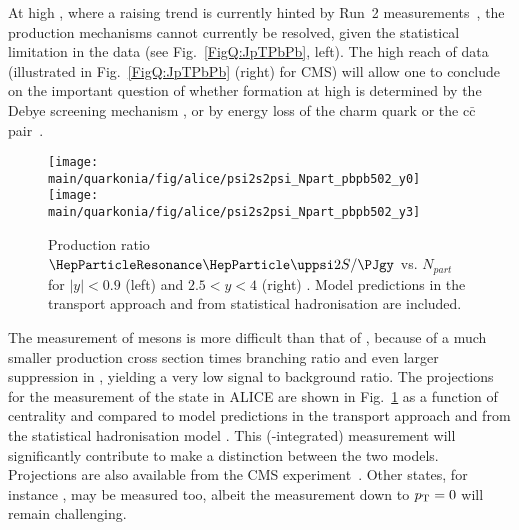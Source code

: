\documentclass[../report.tex]{subfiles}
\providecommand{\main}{..}
\begin{document}
At high \pT, where a raising trend is currently hinted by Run~2 \raa measurements~\cite{Sirunyan:2017isk,Aaboud:2018quy}, the production mechanisms cannot currently be resolved, given the statistical limitation in the data (see Fig.~\ref{FigQ:JpTPbPb}, left). The high \pt reach of \RunsThreeFour data (illustrated in Fig.~\ref{FigQ:JpTPbPb} (right) for CMS) will allow one to conclude on the important question of whether \PJgy
formation at high \pt is determined by the Debye screening mechanism \cite{Kopeliovich:2014una,Aronson:2017ymv}, or by %
energy loss of the charm quark or the $\text{c}\bar{\text{c}}$ pair~\cite{Spousta:2016agr,Arleo:2017ntr}.



\begin{figure}[h]
\begin{center}
 \texttt{[image: \\main/quarkonia/fig/alice/psi2s2psi\_Npart\_pbpb502\_y0]}
 \texttt{[image: \\main/quarkonia/fig/alice/psi2s2psi\_Npart\_pbpb502\_y3]}
\end{center}
 \caption{Production ratio $\PGyP{2S}/\PJgy$ vs. $N_{part}$ for $|y|<0.9$ (left) and $2.5<y<4$ (right) \cite{Abelevetal:2014cna,CERN-LHCC-2013-014}. Model predictions in the transport approach \cite{Du:2015wha}  and from statistical hadronisation \cite{Andronic:2017pug} are included.}
\label{FigQ:psi2SPbPb}
\end{figure}

The measurement of  mesons is more difficult than that of \PJgy, because of a much smaller production cross section times branching ratio and even larger suppression in \PbPb, yielding a very low signal to background ratio.
The projections for the measurement of the  state in ALICE are shown in Fig.~\ref{FigQ:psi2SPbPb} as a function of centrality and compared to model predictions in the transport approach \cite{Du:2015wha}  and from the statistical hadronisation model \cite{Andronic:2017pug}. This (\pT-integrated) measurement will significantly contribute to make a distinction between the two models. Projections are also available from the CMS experiment~\cite{CMS-PAS-FTR-17-002}.
Other states, for instance \PGcc, may be measured too, albeit the measurement down to $p\sb{\scriptstyle\mathrm{T}}=0$ will remain challenging.
\end{document}
